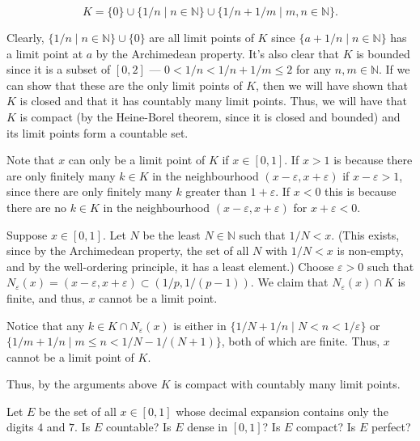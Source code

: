 \documentclass[12 pt, letterpaper]{hmcpset}
\begin{document}
\begin{solution}
	\[
		\boxed{
			K = \{ 0 \} \cup \{ 1/n \mid n \in \mathbb{N} \} \cup \{ 1/n + 1/m \mid m, n \in \mathbb{N} \}.
		}
	\]

	Clearly, $\{ 1/n \mid n \in \mathbb{N} \} \cup \{ 0 \}$ are all limit points of $K$ since $\{ a + 1/n \mid n \in \mathbb{N} \}$ has a limit point at $a$ by the Archimedean property. It's also clear that $K$ is bounded since it is a subset of $[0, 2]$ --- $0 < 1/n < 1/n + 1/m \le 2$ for any $n, m \in \mathbb{N}$. If we can show that these are the only limit points of $K$, then we will have shown that $K$ is closed and that it has countably many limit points. Thus, we will have that $K$ is compact (by the Heine-Borel theorem, since it is closed and bounded) and its limit points form a countable set.

	 Note that $x$ can only be a limit point of $K$ if $x \in [0, 1]$. If $x > 1$ is because there are only finitely many $k \in K$ in the neighbourhood $(x - \varepsilon, x + \varepsilon)$ if $x - \varepsilon > 1$, since there are only finitely many $k$ greater than $1 + \varepsilon$. If $x < 0$ this is because there are no $k \in K$ in the neighbourhood $(x - \varepsilon, x + \varepsilon)$ for $x + \varepsilon < 0$.

	 Suppose $x \in [0, 1]$. Let $N$ be the least $N \in \mathbb{N}$ such that $1/N < x$. (This exists, since by the Archimedean property, the set of all $N$ with $1 / N < x$ is non-empty, and by the well-ordering principle, it has a least element.) Choose $\varepsilon > 0$ such that $N_{\varepsilon}(x) = (x - \varepsilon, x + \varepsilon) \subset (1/p, 1/(p - 1))$. We claim that $N_{\varepsilon}(x) \cap K$ is finite, and thus, $x$ cannot be a limit point.

	 Notice that any $k \in K \cap N_{\varepsilon}(x)$ is either in $\{ 1/N + 1/n \mid N < n < 1/\varepsilon \}$ or $\{ 1/m + 1/n \mid m \le n < 1/N - 1/(N + 1) \}$, both of which are finite. Thus, $x$ cannot be a limit point of $K$.

	 Thus, by the arguments above $K$ is compact with countably many limit points.
\end{solution}

\pagebreak

\begin{problem}
	Let $E$ be the set of all $x \in [0, 1]$ whose decimal expansion contains only the digits $4$ and $7$. Is $E$ countable? Is $E$ dense in $[0, 1]$? Is $E$ compact? Is $E$ perfect?
\end{problem}
\end{document}
